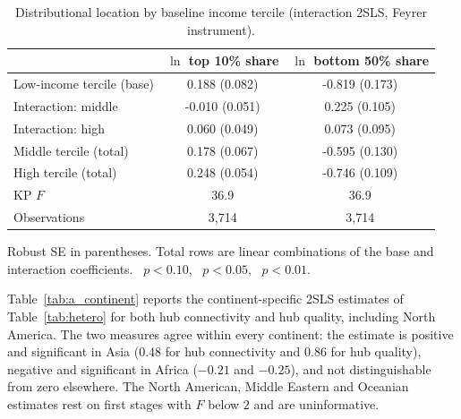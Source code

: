 \begin{table}[H]\centering\caption{Distributional location by baseline income tercile (interaction 2SLS, Feyrer instrument).}\label{tab:a_tails_inc3}
\begin{threeparttable}\small\begin{tabular}{lcc}
\toprule
 & $\ln$ top 10\% share & $\ln$ bottom 50\% share \\
\midrule
Low-income tercile (base) & 0.188\sym{**} (0.082) & -0.819\sym{***} (0.173) \\
\quad Interaction: middle & -0.010 (0.051) & 0.225\sym{**} (0.105) \\
\quad Interaction: high & 0.060 (0.049) & 0.073 (0.095) \\
Middle tercile (total) & 0.178\sym{***} (0.067) & -0.595\sym{***} (0.130) \\
High tercile (total) & 0.248\sym{***} (0.054) & -0.746\sym{***} (0.109) \\
\midrule
KP $F$ & 36.9 & 36.9 \\
Observations & 3,714 & 3,714 \\
\bottomrule
\end{tabular}
\begin{tablenotes}\footnotesize\item Robust SE in parentheses. Total rows are linear combinations of the base and interaction coefficients. \sym{*}~$p<0.10$, \sym{**}~$p<0.05$, \sym{***}~$p<0.01$.\end{tablenotes}\end{threeparttable}\end{table}

Table~\ref{tab:a_continent} reports the continent-specific 2SLS estimates of Table~\ref{tab:hetero} for both hub connectivity and hub quality, including North America. The two measures agree within every continent: the estimate is positive and significant in Asia ($0.48$ for hub connectivity and $0.86$ for hub quality), negative and significant in Africa ($-0.21$ and $-0.25$), and not distinguishable from zero elsewhere. The North American, Middle Eastern and Oceanian estimates rest on first stages with $F$ below $2$ and are uninformative.

